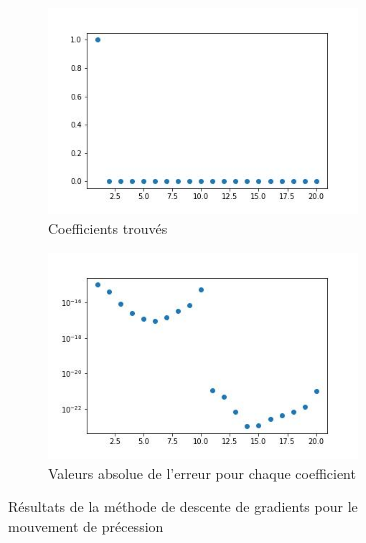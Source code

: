 \documentclass[12pt]{report}
\begin{document}
\begin{figure}
    \centering
    \begin{subfigure}[b]{0.4\textwidth}
        \centering
        \includegraphics[width=0.9\textwidth, height=0.9\textwidth]{coefs_2_DG.jpg}
        \caption{Coefficients trouvés}
    \end{subfigure}
    \hfill
    \begin{subfigure}[b]{0.4\textwidth}
        \centering
        \includegraphics[width=0.9\textwidth, height=0.9\textwidth]{coefs_2_DG_erreur.jpg}
        \caption{Valeurs absolue de l'erreur pour chaque coefficient}
    \end{subfigure}
    \caption{Résultats de la méthode de descente de gradients pour le mouvement de précession}
    \label{fig:resultats2DG}
\end{figure}
\end{document}
